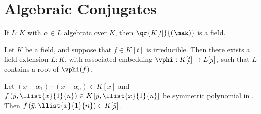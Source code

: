 \documentclass{article}
\begin{document}


\section{Algebraic Conjugates}


\begin{tcorollary}
  If \( L:K \) with \( \alpha\in L \) algebraic over \( K \), then \( \qr{K[t]}{(\mak)} \) is a field.
\end{tcorollary}

\begin{ttheorem}
  Let \( K \) be a field, and suppose that \( f\in K[t] \) is irreducible.
  Then there exists a field extension \( L:K \), with associated embedding \( \vphi:K[t]\to L[y] \), such that \( L \) contains a root of \( \vphi(f) \).
\end{ttheorem}


\begin{tlemma}
  Let \( \left( x-\alpha_1 \right)\cdots\left( x-\alpha_n \right)\in K[x] \) and \( f\left(\bar y,\llist{x}{1}{n}\right)\in K\left[\bar y,\llist{x}{1}{n}\right] \) be symmetric polynomial in .
  Then \( f\left(\bar y,\llist{x}{1}{n}\right) \in K[\bar y] \).
\end{tlemma}
\end{document}
